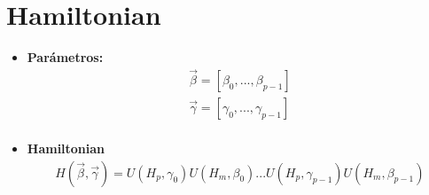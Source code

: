 \documentclass{article}
\begin{document}
\section{Hamiltonian}
\begin{itemize}
\item \textbf{Parámetros:}
  \begin{align*}
    \vec{\beta} = [\beta_0, ..., \beta_{p-1}]\\
    \vec{\gamma} = [\gamma_0, ..., \gamma_{p-1}]\\
  \end{align*}

\item \textbf{Hamiltonian}
  \begin{align*}
    H(\vec{\beta}, \vec{\gamma}) = U(H_p, \gamma_0)U(H_m, \beta_0) ... U(H_p, \gamma_{p-1})U(H_m, \beta_{p-1})
  \end{align*}

\end{itemize}
\end{document}
